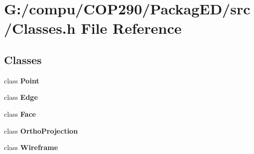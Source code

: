 \section{G\+:/compu/\+C\+O\+P290/\+Packag\+E\+D/src/\+Classes.h File Reference}
\label{_classes_8h}
\subsection*{Classes}
\begin{DoxyCompactItemize}
\item 
class \textbf{ Point}
\item 
class \textbf{ Edge}
\item 
class \textbf{ Face}
\item 
class \textbf{ Ortho\+Projection}
\item 
class \textbf{ Wireframe}
\end{DoxyCompactItemize}
